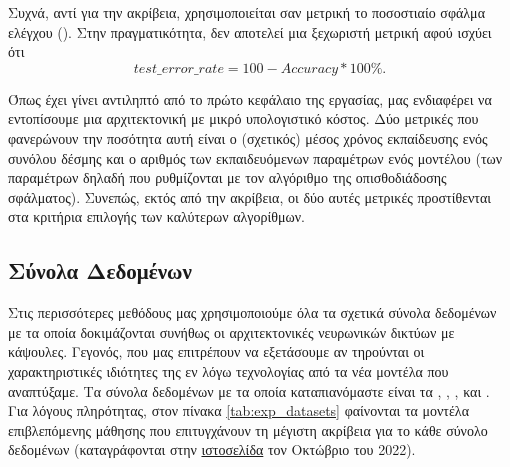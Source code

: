 Συχνά, αντί για την ακρίβεια, χρησιμοποιείται σαν μετρική το ποσοστιαίο σφάλμα ελέγχου (). Στην πραγματικότητα, δεν αποτελεί μια ξεχωριστή μετρική αφού ισχύει ότι $$test\_error\_rate = 100 - Accuracy*100\%.$$ \par

Όπως έχει γίνει αντιληπτό από το πρώτο κεφάλαιο της εργασίας, μας ενδιαφέρει να εντοπίσουμε μια αρχιτεκτονική με μικρό υπολογιστικό κόστος. Δύο μετρικές που φανερώνουν την ποσότητα αυτή είναι ο (σχετικός) μέσος χρόνος εκπαίδευσης ενός συνόλου δέσμης και ο αριθμός των εκπαιδευόμενων παραμέτρων ενός μοντέλου (των παραμέτρων δηλαδή που ρυθμίζονται με τον αλγόριθμο της οπισθοδιάδοσης σφάλματος). Συνεπώς, εκτός από την ακρίβεια, οι δύο αυτές μετρικές προστίθενται στα κριτήρια επιλογής των καλύτερων αλγορίθμων.

\subsection{Σύνολα Δεδομένων}
Στις περισσότερες μεθόδους μας χρησιμοποιούμε όλα τα σχετικά σύνολα δεδομένων με τα οποία δοκιμάζονται συνήθως οι αρχιτεκτονικές νευρωνικών δικτύων με κάψουλες. Γεγονός, που μας επιτρέπουν να εξετάσουμε αν τηρούνται οι χαρακτηριστικές ιδιότητες της εν λόγω τεχνολογίας από τα νέα μοντέλα που αναπτύξαμε. Τα σύνολα δεδομένων με τα οποία καταπιανόμαστε είναι τα \cite{deng2012mnist}, \cite{Xiao2017FashionMNISTAN}, \cite{CIFAR10}, \cite{sabour2017dynamic} και \cite{lecun2004learning}. Για λόγους πληρότητας, στον πίνακα \ref{tab:exp_datasets} φαίνονται τα μοντέλα επιβλεπόμενης μάθησης που επιτυγχάνουν τη μέγιστη ακρίβεια για το κάθε σύνολο δεδομένων (καταγράφονται στην \href{https://paperswithcode.com/}{ιστοσελίδα} τον Οκτώβριο του 2022).


\begin{table}[h]
    \begin{center}
        \end{center}
        \caption{\label{tab:exp_datasets} Πίνακας που συγκεντρώνει το καλύτερο μοντέλο και την απόδοσή του, για κάθε σύνολο δεδομένων.}
    \end{table}
